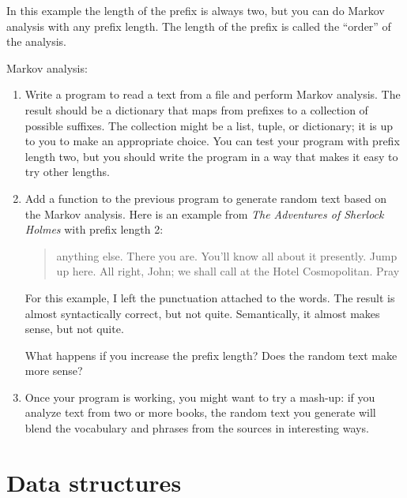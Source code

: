 \documentclass[10pt]{book}
\begin{document}
In this example the length of the prefix is always two, but
you can do Markov analysis with any prefix length.  The length
of the prefix is called the ``order'' of the analysis.

\begin{ex}
Markov analysis:

\begin{enumerate}

\item Write a program to read a text from a file and perform Markov
analysis.  The result should be a dictionary that maps from
prefixes to a collection of possible suffixes.  The collection
might be a list, tuple, or dictionary; it is up to you to make
an appropriate choice.  You can test your program with prefix
length two, but you should write the program in a way that makes
it easy to try other lengths.

\item Add a function to the previous program to generate random text
based on the Markov analysis.  Here is an example from {\em The Adventures of Sherlock Holmes}
with prefix length 2:

\begin{quote}
anything else. There you are. You'll know all about it presently. Jump up here. All right, John; we shall call at the Hotel Cosmopolitan. Pray
\end{quote}

For this example, I left the punctuation attached to the words.
The result is almost syntactically correct, but not quite.
Semantically, it almost makes sense, but not quite.

What happens if you increase the prefix length?  Does the random
text make more sense?


\item Once your program is working, you might want to try a mash-up:
if you analyze text from two or more books, the random
text you generate will blend the vocabulary and phrases from
the sources in interesting ways.

\end{enumerate}
\end{ex}


\section{Data structures}

\end{document}
